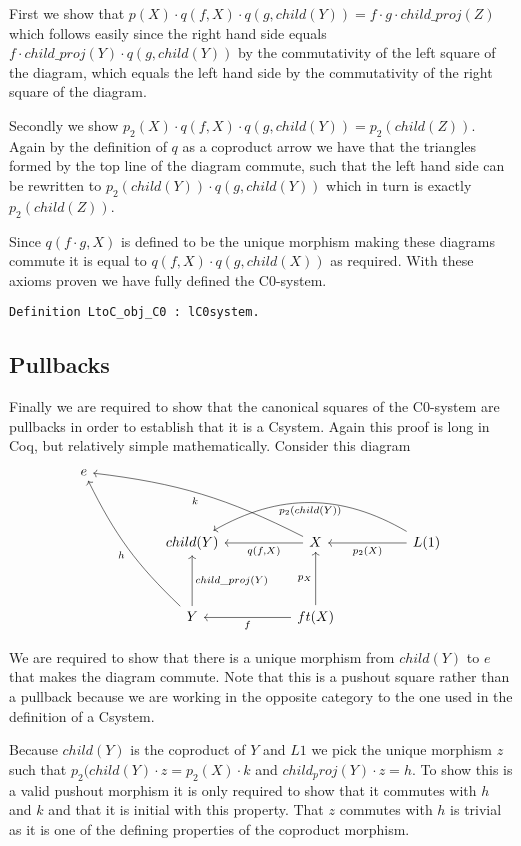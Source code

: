 First we show that $p(X)\cdot q(f, X)\cdot q(g, child(Y)) = f\cdot g\cdot
child\_proj(Z)$ which follows easily since the right hand side equals $f\cdot
child\_proj(Y)\cdot q(g, child(Y))$ by the commutativity of the left square of
the diagram, which equals the left hand side by the commutativity of the right
square of the diagram.

Secondly we show $p_2(X)\cdot q(f, X)\cdot q(g, child(Y)) = p_2 (child(Z))$.
Again by the definition of $q$ as a coproduct arrow we have that the triangles
formed by the top line of the diagram commute, such that the left hand side can
be rewritten to $p_2(child(Y))\cdot q(g, child(Y))$ which in turn is exactly
$p_2(child(Z))$.

Since $q(f\cdot g, X)$ is defined to be the unique morphism making these
diagrams commute it is equal to $q(f, X)\cdot q(g, child(X))$ as required. With
these axioms proven we have fully defined the C0-system.
\begin{lstlisting}
Definition LtoC_obj_C0 : lC0system.
\end{lstlisting}

\subsection{Pullbacks}
Finally we are required to show that the canonical squares of the C0-system are
pullbacks in order to establish that it is a Csystem. Again this proof is long
in Coq, but relatively simple mathematically. Consider this diagram
\[
\begin{tikzcd}[sep=huge]
  e &&&\\
  &
  child(Y)&
  X
  \ar[l, "{q(f,X)}"]
  \ar[ull, bend right=10, "k"]&
  L(1)
  \ar[l, "p_2(X)"]
  \ar[ll, bend right=30, "p_2(child(Y))"]\\
  &
  Y
  \ar[uul, bend left=10, "h"]
  \ar[u, "child\_proj(Y)"']&
  ft(X)
  \ar[l, "f"]
  \ar[u, "p_X"]
\end{tikzcd}  
\]

We are required to show that there is a unique morphism from $child(Y)$ to $e$
that makes the diagram commute. Note that this is a pushout square rather than a
pullback because we are working in the opposite category to the one used in the
definition of a Csystem.

Because $child(Y)$ is the coproduct of $Y$ and $L 1$ we pick the unique morphism
$z$ such that $p_2(child(Y)\cdot z = p_2(X)\cdot k$ and $child_proj(Y)\cdot z =
h$. To show this is a valid pushout morphism it is only required to show that it
commutes with $h$ and $k$ and that it is initial with this property. That $z$
commutes with $h$ is trivial as it is one of the defining properties of the
coproduct morphism. 

